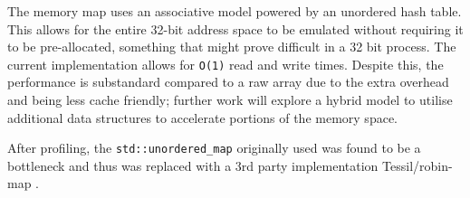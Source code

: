 The memory map uses an associative model powered by an unordered hash table. This allows for the entire 32-bit address space to be emulated without requiring it to be pre-allocated, something that might prove difficult in a 32 bit process. The current implementation allows for \texttt{O(1)} read and write times. Despite this, the performance is substandard compared to a raw array due to the extra overhead and being less cache friendly; further work will explore a hybrid model to utilise additional data structures to accelerate portions of the memory space.

After profiling, the \texttt{std::unordered\_map} originally used was found to be a bottleneck and thus was replaced with a 3rd party implementation Tessil/robin-map \cite{tessil-map, tessil-benchmark}.
